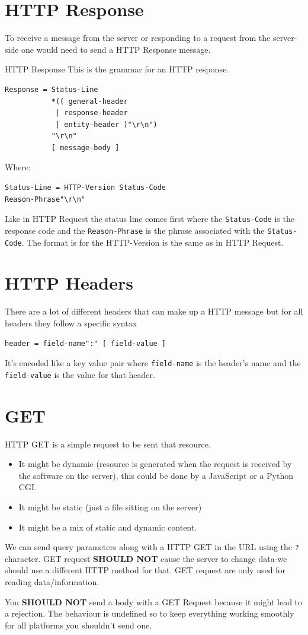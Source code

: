 \documentclass[../CMPUT-404-Notes.tex]{subfiles}
\begin{document}
\section{HTTP Response}
To receive a message from the server or responding to a request from the server-side one would need to send a HTTP Response message.
\begin{Definition}
{HTTP Response}
This is the grammar for an HTTP response.
\begin{verbatim}
Response = Status-Line
           *(( general-header
            | response-header 
            | entity-header )"\r\n")
           "\r\n"
           [ message-body ]
\end{verbatim}
Where:
\begin{verbatim}
Status-Line = HTTP-Version Status-Code 
Reason-Phrase"\r\n"
\end{verbatim}
Like in HTTP Request the status line comes first where the \texttt{Status-Code} is the response code and the \texttt{Reason-Phrase} is the phrase associated with the \texttt{Status-Code}.
The format is for the HTTP-Version is the same as in HTTP Request.
\end{Definition}

\section{HTTP Headers}
There are a lot of different headers that can make up a HTTP message but for all headers they follow a specific syntax
\begin{verbatim}
header = field-name":" [ field-value ]
\end{verbatim}
It's encoded like a key value pair where \texttt{field-name} is the header's name and the \texttt{field-value} is the value for that header. 

\section{GET}
HTTP GET is a simple request to be sent that resource.
\begin{itemize}
  \item It might be dynamic (resource is generated when the request is received by the software on the server), this could be done by a JavaScript or a Python CGI.
  \item It might be static (just a file sitting on the server)
  \item It might be a mix of static and dynamic content.
\end{itemize}
We can send query parameters along with a HTTP GET in the URL using the \texttt{?} character.
GET request \textbf{SHOULD NOT} cause the server to change data-we should use a different HTTP method for that. 
GET request are only used for reading data/information.
\begin{Note}
  You \textbf{SHOULD NOT} send a body with a GET Request because it might lead to a rejection. The behaviour is undefined so to keep everything working smoothly for all platforms you shouldn't send one.
\end{Note}
\end{document}
